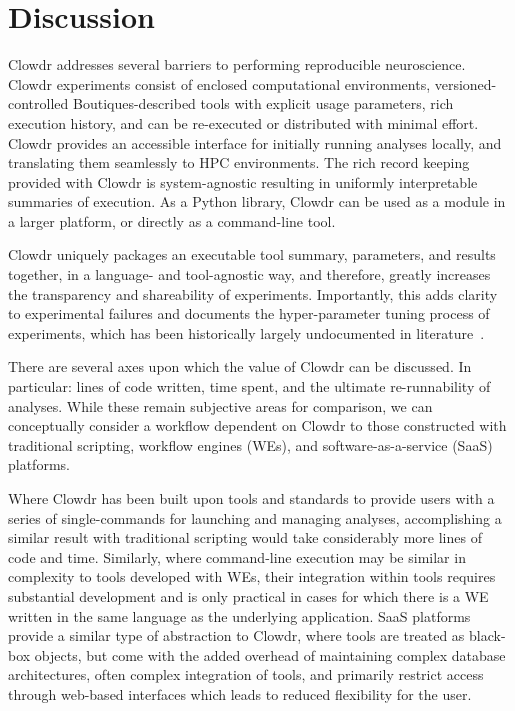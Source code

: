 \documentclass[fleqn,12pt]{SelfArx_ch} %
\begin{document}
\section{Discussion}
Clowdr addresses several barriers to performing reproducible neuroscience. Clowdr experiments consist of enclosed
computational environments, versioned-controlled Boutiques-described tools with explicit usage parameters, rich
execution history, and can be re-executed or distributed with minimal effort. Clowdr provides an accessible interface
for initially running analyses locally, and translating them seamlessly to HPC environments. The rich record keeping
provided with Clowdr is system-agnostic resulting in uniformly interpretable summaries of execution. As a Python
library, Clowdr can be used as a module in a larger platform, or directly as a command-line tool.

Clowdr uniquely packages an executable tool summary, parameters, and results together, in a language- and tool-agnostic
way, and therefore, greatly increases the transparency and shareability of experiments. Importantly, this adds clarity
to experimental failures and documents the hyper-parameter tuning process of experiments, which has been historically
largely undocumented in literature~\cite{Reunanen2003-fr}.

There are several axes upon which the value of Clowdr can be discussed. In particular: lines of code written, time
spent, and the ultimate re-runnability of analyses. While these remain subjective areas for comparison, we can
conceptually consider a workflow dependent on Clowdr to those constructed with traditional scripting, workflow engines
(WEs), and software-as-a-service (SaaS) platforms.

Where Clowdr has been built upon tools and standards to provide users with a series of single-commands for launching
and managing analyses, accomplishing a similar result with traditional scripting would take considerably more lines of
code and time. Similarly, where command-line execution may be similar in complexity to tools developed with WEs, their
integration within tools requires substantial development and is only practical in cases for which there is a WE
written in the same language as the underlying application. SaaS platforms provide a similar type of abstraction to
Clowdr, where tools are treated as black-box objects, but come with the added overhead of maintaining complex database
architectures, often complex integration of tools, and primarily restrict access through web-based interfaces which
leads to reduced flexibility for the user.
\end{document}
